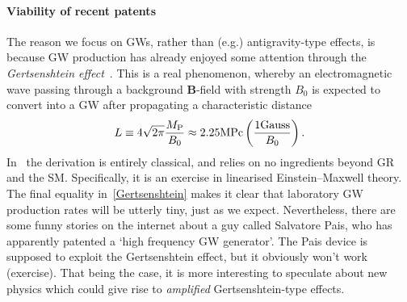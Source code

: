 \documentclass[aps,prd,reprint,preprintnumbers,showpacs,floatfix,nofootinbib,superscript address,longbibliography]{revtex4-2}
\begin{document}
\paragraph*{Viability of recent patents} The reason we focus on GWs, rather than (e.g.) antigravity-type effects, is because GW production has already enjoyed some attention through the \emph{Gertsenshtein effect}~\cite{Palessandro:2023tee}. This is a real phenomenon, whereby an electromagnetic wave passing through a background $\textbf{B}$-field with strength $B_0$ is expected to convert into a GW after propagating a characteristic distance
\begin{equation}\label{Gertsenshtein}
	L\equiv4\sqrt{2\pi}\frac{{M_{\mathrm{P}}}}{B_0}\approx 2.25\text{MPc}\left(\frac{1\text{Gauss}}{B_0}\right).
\end{equation}
In~\cite{Palessandro:2023tee} the derivation is entirely classical, and relies on no ingredients beyond GR and the SM. Specifically, it is an exercise in linearised Einstein--Maxwell theory. The final equality in~\cref{Gertsenshtein} makes it clear that laboratory GW production rates will be utterly tiny, just as we expect. Nevertheless, there are some funny stories on the internet about a guy called Salvatore Pais, who has apparently patented a `high frequency GW generator'. The Pais device is supposed to exploit the Gertsenshtein effect, but it obviously won't work (exercise). That being the case, it is more interesting to speculate about new physics which could give rise to \emph{amplified} Gertsenshtein-type effects.
\end{document}
